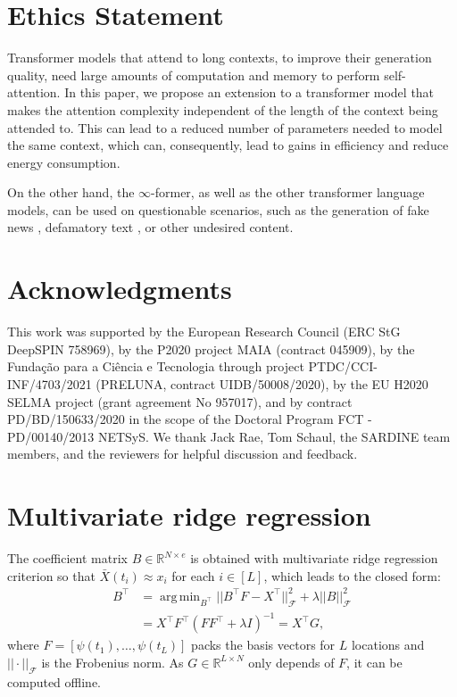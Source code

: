 \documentclass[11pt]{article}
\DeclareMathOperator*{\argmin}{arg\,min}
\begin{document}
\section*{Ethics Statement}
Transformer models that attend to long contexts, to improve their generation quality, need large amounts of computation and memory to perform self-attention. In this paper, we propose an extension to a transformer model that makes the attention complexity independent of the length of the context being attended to. This can lead to a reduced number of parameters needed to model the same context, which can, consequently, lead to gains in efficiency and reduce energy consumption. 

On the other hand, the $\infty$-former, as well as the other transformer language models, can be used on questionable scenarios, such as the generation of fake news \citep{zellers2019defending}, defamatory text \citep{wallace2019universal}, or other undesired content.

\section*{Acknowledgments}
This work was supported by the European Research Council (ERC StG DeepSPIN 758969), 
by the P2020 project MAIA (contract 045909), by the Funda\c{c}\~ao para a Ci\^encia e Tecnologia through project PTDC/CCI-INF/4703/2021 (PRELUNA, contract UIDB/50008/2020), by the EU H2020 SELMA project (grant agreement No 957017), and by contract PD/BD/150633/2020 in the scope of the  Doctoral Program  FCT - PD/00140/2013 NETSyS. We thank Jack Rae, Tom Schaul, the SARDINE team members, and the reviewers for helpful discussion and feedback.




\clearpage
\appendix


\section{Multivariate ridge regression}
\label{app:reg}
The coefficient matrix $B \in \mathbb{R}^{N\times e}$ is obtained with multivariate ridge regression criterion so that $\bar{X}(t_i) \approx x_i$ for each $i \in [L]$, which leads to the closed form:
\begin{align}\label{eq:reg}
    B^\top &= \argmin_{B^\top} ||B^\top F - X^\top||_\mathcal{F}^2 + \lambda||B||_\mathcal{F}^2 \\\nonumber
        &= X^\top F^\top (FF^\top + \lambda I)^{-1} = X^\top G,
\end{align}
where $F=[\psi(t_1),\dots,\psi(t_L)]$ packs the basis vectors for $L$ locations and $||\cdot||_\mathcal{F}$ is the Frobenius norm. As $G \in \mathbb{R}^{L\times N}$ only depends of $F$, it can be computed offline.
\end{document}

